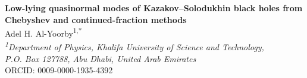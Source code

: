 \documentclass[12pt,a4paper]{article}
\begin{document}
\ifdefined\markedrevision
  \linenumbers
\fi
\begin{center}
{\Large\bfseries Low-lying quasinormal modes of Kazakov--Solodukhin black holes from Chebyshev and continued-fraction methods}\\
\vspace{1.2em}
{\normalsize Adel H. Al-Yoorby\textsuperscript{1,*}}\\
\vspace{0.25em}
{\itshape \textsuperscript{1}Department of Physics, Khalifa University of Science and Technology,}\\
{\itshape P.O. Box 127788, Abu Dhabi, United Arab Emirates}\\
\vspace{0.25em}
{\small ORCID: 0009-0000-1935-4392}
\end{center}
\end{document}
